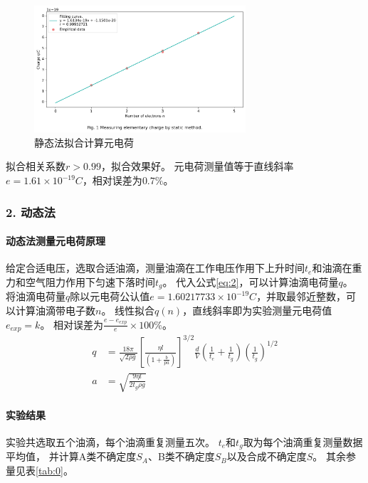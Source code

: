 \documentclass[12pt,a4paper,UTF8]{ctexart}
\begin{document}
    \begin{figure}[htbp]
        \centering
        \includegraphics[width=0.7\textwidth]{attachments/fig.1.png}
        \caption{静态法拟合计算元电荷}
        \label{fig:1}
    \end{figure}

    拟合相关系数$r>0.99$，拟合效果好。
    元电荷测量值等于直线斜率$e = 1.61 \times 10^{-19} C$，相对误差为$0.7\%$。

    \subsubsection*{2. 动态法}
    \paragraph{动态法测量元电荷原理}
    \newline
	\indent
    给定合适电压，选取合适油滴，测量油滴在工作电压作用下上升时间$t_e$和油滴在重力和空气阻力作用下匀速下落时间$t_g$。
    代入公式\ref{eq:2}，可以计算油滴电荷量$q$。
    将油滴电荷量$q$除以元电荷公认值$e = 1.60217733 \times 10^{-19} C$，并取最邻近整数，可以计算油滴带电子数$n$。
    线性拟合$q(n)$，直线斜率即为实验测量元电荷值$e_{exp} = k$。
    相对误差为$\frac{e-e_{exp}}{e} \times 100\%$。
    \begin{align}
        q &= \frac{18\pi}{\sqrt{2\rho g}}\left[\frac{\eta l}{\left(1+\frac{b}{pa}\right) }\right]^{3/2} \frac{d}{V} \left(\frac{1}{t_e}+\frac{1}{t_g}\right) \left(\frac{1}{t_g}\right)^{1/2} \\
        a &= \sqrt{\frac{9\eta l}{2t_g\rho g}}
        \label{eq:2}
    \end{align}

    \paragraph{实验结果}
    \newline
	\indent
    实验共选取五个油滴，每个油滴重复测量五次。
    $t_e$和$t_g$取为每个油滴重复测量数据平均值，
    并计算A类不确定度$S_A$、B类不确定度$S_B$以及合成不确定度$S$。
    其余参量见表\ref{tab:0}。
    
\end{document}
